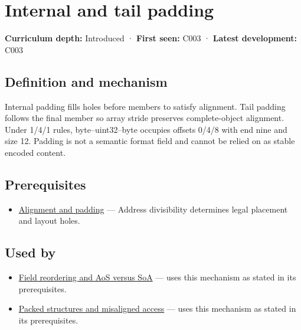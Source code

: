 \hypertarget{appendix-f52f8c5a3afd}{}\label{referencestart:appendix-f52f8c5a3afd}
\section{Internal and tail padding}\label{appendix-f52f8c5a3afd-internal-and-tail-padding}

\textbf{Curriculum depth:} Introduced · \textbf{First seen:} C003 · \textbf{Latest development:} C003

\begin{allmightroledefinition}

\subsection{Definition and mechanism}\label{appendix-f52f8c5a3afd-definition-and-mechanism}

Internal padding fills holes before members to satisfy alignment. Tail padding follows the final member so array stride preserves complete-object alignment. Under 1/4/1 rules, byte--uint32--byte occupies offsets 0/4/8 with end nine and size 12. Padding is not a semantic format field and cannot be relied on as stable encoded content.

\end{allmightroledefinition}

\subsection{Prerequisites}\label{appendix-f52f8c5a3afd-prerequisites}

\begin{itemize}
\tightlist
\item
  \hyperref[appendix-a1f7c53b4742]{Alignment and padding} --- Address divisibility determines legal placement and layout holes.
\end{itemize}

\subsection{Used by}\label{appendix-f52f8c5a3afd-used-by}

\begin{itemize}
\tightlist
\item
  \hyperref[appendix-5522ad176ca0]{Field reordering and AoS versus SoA} --- uses this mechanism as stated in its prerequisites.
\item
  \hyperref[appendix-0682dbfc5f0e]{Packed structures and misaligned access} --- uses this mechanism as stated in its prerequisites.
\end{itemize}

